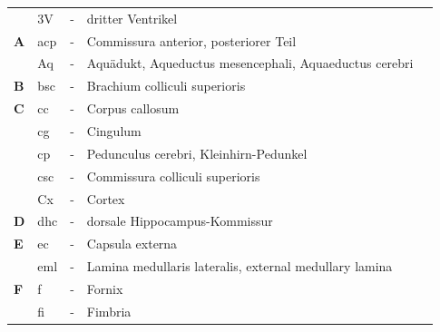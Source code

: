 \documentclass[12pt,a4paper,pdftex]{article}
\begin{document}
\begin{table}[H]
\begin{tabular}{llcll}
           & 3V  & -          & dritter Ventrikel                                                       & \multicolumn{1}{c}{\textbf{}} \\
\textbf{A} & acp & -          & Commissura anterior, posteriorer Teil                                   & \multicolumn{1}{c}{}          \\
\textbf{}  & Aq  & -          & Aquädukt, Aqueductus mesencephali, Aquaeductus cerebri                  & \multicolumn{1}{c}{}          \\
\textbf{B} & bsc & -          & Brachium colliculi superioris                                           & \multicolumn{1}{c}{}          \\
\textbf{C} & cc  & -          & Corpus callosum                                                         & \multicolumn{1}{c}{\textbf{}} \\
\textbf{}  & cg  & -          & Cingulum                                                                & \multicolumn{1}{c}{\textbf{}} \\
\textbf{ } & cp  & -          & Pedunculus cerebri, Kleinhirn-Pedunkel                                  & \multicolumn{1}{c}{\textbf{}} \\
\textbf{ } & csc & -          & Commissura colliculi superioris                                         & \multicolumn{1}{c}{\textbf{}} \\
\textbf{}  & Cx  & -          & Cortex                                                                  & \multicolumn{1}{c}{}          \\
\textbf{D} & dhc & -          & dorsale Hippocampus-Kommissur                                           & \multicolumn{1}{c}{}          \\
\textbf{E} & ec  & -          & Capsula externa                                                         &                               \\
\textbf{ } & eml & -          & Lamina medullaris lateralis, external medullary lamina                  &                               \\
\textbf{F} & f   & -          & Fornix                                                                  &                               \\
\textbf{}  & fi  & -          & Fimbria                                                                 &                               \\

\end{tabular}
\end{table}
\end{document}
